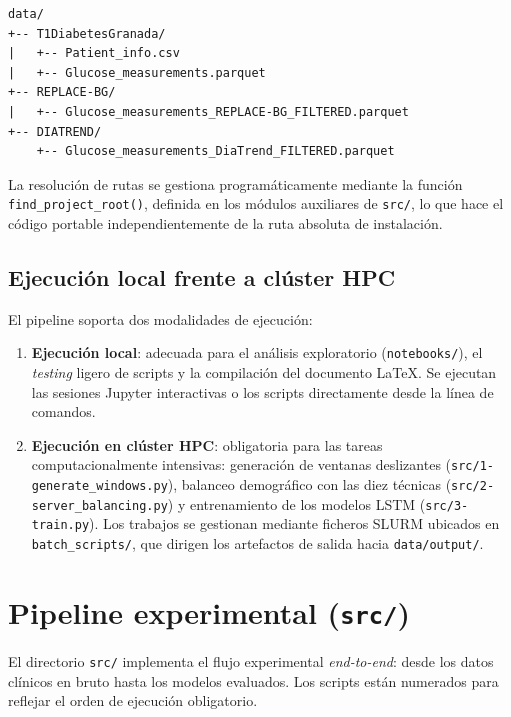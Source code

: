 \begin{verbatim}
data/
+-- T1DiabetesGranada/
|   +-- Patient_info.csv
|   +-- Glucose_measurements.parquet
+-- REPLACE-BG/
|   +-- Glucose_measurements_REPLACE-BG_FILTERED.parquet
+-- DIATREND/
    +-- Glucose_measurements_DiaTrend_FILTERED.parquet
\end{verbatim}

La resolución de rutas se gestiona programáticamente mediante la función
\texttt{find\_project\_root()}, definida en los módulos auxiliares de
\texttt{src/}, lo que hace el código portable independientemente de la
ruta absoluta de instalación.

\subsection{Ejecución local frente a clúster HPC}
\label{subsec:anexo_hpc}

El pipeline soporta dos modalidades de ejecución:

\begin{enumerate}
    \item \textbf{Ejecución local}: adecuada para el análisis exploratorio
    (\texttt{notebooks/}), el \textit{testing} ligero de scripts y la
    compilación del documento \LaTeX. Se ejecutan las sesiones Jupyter
    interactivas o los scripts directamente desde la línea de comandos.

    \item \textbf{Ejecución en clúster HPC}: obligatoria para las tareas
    computacionalmente intensivas: generación de ventanas deslizantes
    (\texttt{src/1-generate\_windows.py}), balanceo demográfico con las
    diez técnicas (\texttt{src/2-server\_balancing.py}) y entrenamiento
    de los modelos LSTM (\texttt{src/3-train.py}). Los trabajos se
    gestionan mediante ficheros SLURM ubicados en \texttt{batch\_scripts/},
    que dirigen los artefactos de salida hacia \texttt{data/output/}.
\end{enumerate}

\section{Pipeline experimental (\texttt{src/})}
\label{sec:anexo_pipeline}

El directorio \texttt{src/} implementa el flujo experimental
\textit{end-to-end}: desde los datos clínicos en bruto hasta los
modelos evaluados. Los scripts están numerados para reflejar el orden de
ejecución obligatorio.

